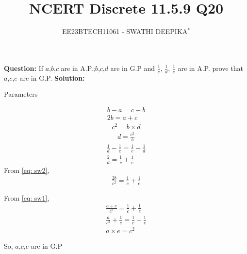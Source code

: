 \documentclass[journal,12pt,twocolumn]{IEEEtran}
\title{
	
\title{NCERT Discrete 11.5.9 Q20}
\author{EE23BTECH11061 - SWATHI DEEPIKA$^{*}$%
}


}
\theoremstyle{remark}
\newcommand{\solution}{\noindent \textbf{Solution: }}
\begin{document}
\maketitle

\textbf{Question:} 
If $a$,$b$,$c$ are in A.P.;$b$,$c$,$d$ are in G.P and $\frac{1}{c}$, $\frac{1}{d}$, $\frac{1}{e}$ are in A.P. prove that $a$,$c$,$e$ are in G.P.
\solution
 \begin{table}[h]
 	\centering
 	\resizebox{6 cm}{!}{
 		
 	}
 	\vspace{6 pt}
 	\caption{Parameters}
 	\label{tab:swa_tabel} 
 \end{table}

 
\begin{align}
b-a = c-b\\
2b=a+c \label{eq: sw1}
\end{align}
\begin{align}
c^2 = b\times d
\end{align}
\begin{align}
d= \frac{c^2}{b} \label{eq: sw2}
\end{align}
\begin{align}
\frac{1}{d} - \frac{1}{c} = \frac{1}{e} - \frac{1}{d}\\
\frac{2}{d} = \frac{1}{c} + \frac{1}{e}
\end{align}
From \eqref{eq: sw2},
\begin{align}
\frac{2b}{c^2} = \frac{1}{c} + \frac{1}{e}
\end{align}

From \eqref{eq: sw1},
\begin{align}\frac{a + c}{c^2} = \frac{1}{c} + \frac{1}{e}\\
\frac{a}{c^2} + \frac{1}{c} = \frac{1}{c} + \frac{1}{e}\\
a \times e = {c}^2
\end{align}

So, $a$,$c$,$e$ are in G.P\\
\end{document}
